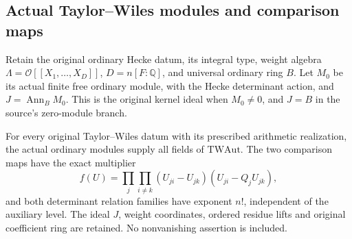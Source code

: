 \subsection{Actual Taylor--Wiles modules and comparison maps}
\label{sec:selmer-taylor-wiles}

Retain the original ordinary Hecke datum, its integral type, weight
algebra \(\Lambda=\mathcal O[[X_1,\ldots,X_D]]\),
\(D=n[F:\mathbb Q]\), and universal ordinary ring \(B\).
Let \(M_0\) be its actual finite free ordinary module, with the
Hecke determinant action, and \(J=\operatorname{Ann}_B M_0\).
This is the original kernel ideal when \(M_0\ne0\), and \(J=B\)
in the source's zero-module branch.

\begin{theorem}
\label{thm:selmer-taylor-wiles}
For every original Taylor--Wiles datum with its prescribed arithmetic
realization, the actual ordinary modules supply all fields of
\(\mathrm{TWAut}\).  The two comparison maps have the exact
multiplier
\[
 f(U)=\prod_j\prod_{i\ne k}
                (U_{ji}-U_{jk})(U_{ji}-Q_jU_{jk}),
\]
and both determinant relation families have exponent \(n!\),
independent of the auxiliary level.  The ideal \(J\), weight
coordinates, ordered residue lifts and original coefficient ring
are retained.  No nonvanishing assertion is included.
\end{theorem}

